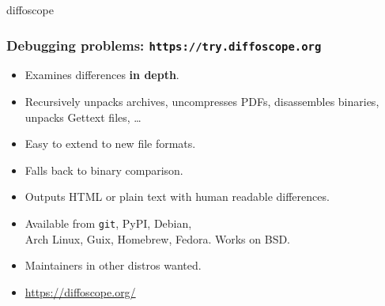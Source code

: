 \documentclass[14pt,aspectratio=169]{beamer}
\begin{document}
{

\begin{frame}{diffoscope}
 \frametitle{Debugging problems: \texttt{https://try.diffoscope.org}}

 \begin{itemize}
  \item Examines differences \textbf{in depth}.
  \item Recursively unpacks archives, uncompresses PDFs, disassembles
  binaries, unpacks Gettext files, …
  \item Easy to extend to new file formats.
  \item Falls back to binary comparison.
  \item Outputs HTML or plain text with human readable differences.
  \item Available from \texttt{git}, PyPI, Debian, \\
   Arch Linux, Guix, Homebrew, Fedora. Works on BSD.
  \item Maintainers in other distros wanted.
  \item \url{https://diffoscope.org/}
 \end{itemize}
\end{frame}


}
\end{document}
